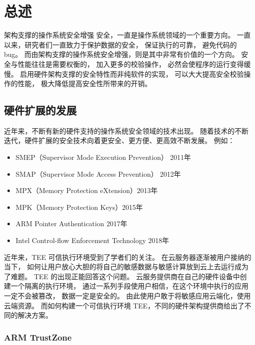 \chapter{总述} %

\label{Chapter1} %

架构支撑的操作系统安全增强
安全，一直是操作系统领域的一个重要方向。
一直以来，研究者们一直致力于保护数据的安全，
保证执行的可靠，
避免代码的 bug。
而由架构支撑的操作系统安全增强，则是其中非常有价值的一个方向。
安全与性能往往是需要权衡的，
加入更多的校验操作，
必然会使程序的运行变得缓慢。
启用硬件架构支撑的安全特性而非纯软件的实现，
可以大大提高安全校验操作的性能，
极大降低提高安全性所带来的开销。

\section{硬件扩展的发展}
近年来，不断有新的硬件支持的操作系统安全领域的技术出现。
随着技术的不断迭代，硬件扩展的安全技术向着更安全、更方便、更高效不断发展。
例如：
\begin{itemize}
    \item SMEP（Supervisor Mode Execution Prevention） 2011年
    \item SMAP（Supervisor Mode Access Prevention） 2012年
    \item MPX（Memory Protection eXtension）2013年
    \item MPK（Memory Protection Keys）2015年
    \item ARM Pointer Authentication 2017年
    \item Intel Control-flow Enforcement Technology 2018年
\end{itemize}
近年来，TEE \cite{TEE}可信执行环境受到了学者们的关注。
在云服务器逐渐被用户接纳的当下，
如何让用户放心大胆的将自己的敏感数据与敏感计算放到云上去运行成为了难题。
TEE 的出现正能回答这个问题。
云服务提供商在自己的硬件设备中创建一个隔离的执行环境，
通过一系列手段使用户相信，在这个环境中执行的应用一定不会被篡改，
数据一定是安全的。
由此使用户敢于将敏感应用云端化，使用云端资源。
而如何构建一个可信执行环境 TEE，不同的硬件架构提供商给出了不同的解决方案。

\subsection{ARM TrustZone}
